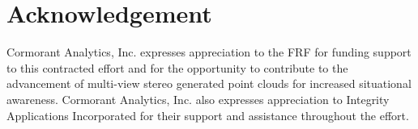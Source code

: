 \documentclass{report}
\begin{document}
%	
	
	\chapter*{Acknowledgement}
	Cormorant Analytics, Inc. expresses appreciation to the FRF for funding support to this contracted effort and for the opportunity to contribute to the advancement of multi-view stereo generated point clouds for increased situational awareness.  Cormorant Analytics, Inc. also expresses appreciation to Integrity Applications Incorporated for their support and assistance throughout the effort.
	\appendix
	
\end{document}
